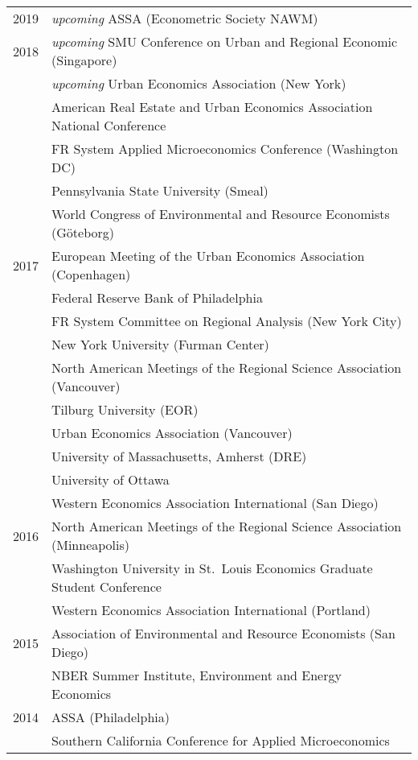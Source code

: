 \documentclass[english, 10pt]{report}
\begin{document}
\begin{longtable}{@{}p{0.4in}p{6.1in}}
	2019 	& \emph{upcoming} ASSA (Econometric Society NAWM) \\
	2018 	& \emph{upcoming} SMU Conference on Urban and Regional Economic (Singapore) \\
			& \emph{upcoming} Urban Economics Association (New York) \\
			& American Real Estate and Urban Economics Association National Conference\\
			& FR System Applied Microeconomics Conference (Washington DC) \\
			& Pennsylvania State University (Smeal) \\
			& World Congress of Environmental and Resource Economists (G\"{o}teborg)\\
	2017 	& European Meeting of the Urban Economics Association (Copenhagen) \\
			& Federal Reserve Bank of Philadelphia \\
			& FR System Committee on Regional Analysis (New York City) \\
			& New York University (Furman Center) \\
			& North American Meetings of the Regional Science Association (Vancouver) \\
			& Tilburg University (EOR) \\
			& Urban Economics Association (Vancouver) \\
			& University of Massachusetts, Amherst (DRE) \\
			& University of Ottawa  \\
			& Western Economics Association International (San Diego)\\
	2016 	& North American Meetings of the Regional Science Association (Minneapolis) \\
			& Washington University in St.\ Louis Economics Graduate Student Conference \\
			& Western Economics Association International (Portland) \\
	2015		& Association of Environmental and Resource Economists (San Diego) \\
			& NBER Summer Institute, Environment and Energy Economics \\
	2014 	& ASSA (Philadelphia) \\
			& Southern California Conference for Applied Microeconomics 
\end{longtable}

\vspace{-0.1in}
\end{document}
